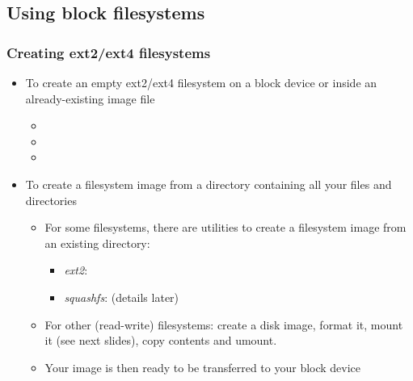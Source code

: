 \subsection{Using block filesystems}

\begin{frame}
  \frametitle{Creating ext2/ext4 filesystems}
  \begin{itemize}
  \item To create an empty ext2/ext4 filesystem on a block device or
    inside an already-existing image file
    \begin{itemize}
    \item {}
    \item {}
    \item {}
    \end{itemize}
  \item To create a filesystem image from a directory containing all
    your files and directories
    \begin{itemize}
    \item For some filesystems, there are utilities to create a
          filesystem image from an existing directory:
          \begin{itemize}
          \item {\em ext2}: 
	  \item {\em squashfs}:  (details later)
          \end{itemize}
    \item For other (read-write) filesystems: create a disk image,
          format it, mount it (see next slides), copy contents and umount.
    \item Your image is then ready to be transferred to your block device
    \end{itemize}
  \end{itemize}
\end{frame}

